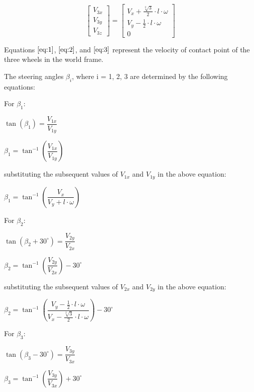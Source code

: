 \documentclass[answers]{exam}
\begin{document}
\begin{questions}
\begin{solution}
            \begin{equation} \label{eq:3}
                \begin{bmatrix}
                    V_{3x} \\
                    V_{3y} \\
                    V_{3z}
                \end{bmatrix}
                = \begin{bmatrix}
                    V_x + \frac{\sqrt[2]{3}}{2} \cdot l \cdot \omega \\
                    V_y - \frac{1}{2} \cdot l \cdot \omega           \\
                    0
                \end{bmatrix}
            \end{equation}

            Equations $\eqref{eq:1}$, $\eqref{eq:2}$, and $\eqref{eq:3}$ represent the
            velocity of contact point of the three wheels in the world frame.

            The steering angles $\beta_i$, where i = 1, 2, 3 are determined by the
            following equations:

            For $\beta_1$:

            $\tan(\beta_1) = \dfrac{V_{1x}}{V_{1y}}$

            $\beta_1 = \tan^{-1}(\dfrac{V_{1x}}{V_{1y}})$

            substituting the subsequent values of $V_{1x}$ and $V_{1y}$ in the above
            equation:

            $\beta_1 = \tan^{-1}(\dfrac{V_x}{V_y + l \cdot \omega})$

            For $\beta_2$:

            $\tan(\beta_2 + 30^\circ) = \dfrac{V_{2y}}{V_{2x}}$

            $\beta_2 = \tan^{-1}(\dfrac{V_{2y}}{V_{2x}}) - 30^\circ$

            substituting the subsequent values of $V_{2x}$ and $V_{2y}$ in the above
            equation:

            $\beta_2 = \tan^{-1}(\dfrac{V_y - \frac{1}{2} \cdot l \cdot \omega}{V_x - \frac{\sqrt[2]{3}}{2} \cdot l \cdot \omega}) - 30^\circ$

            For $\beta_3$:

            $\tan(\beta_3 - 30^\circ) = \dfrac{V_{3y}}{V_{3x}}$

            $\beta_3 = \tan^{-1}(\dfrac{V_{3y}}{V_{3x}}) + 30^\circ$


\end{solution}
\end{questions}
\end{document}
